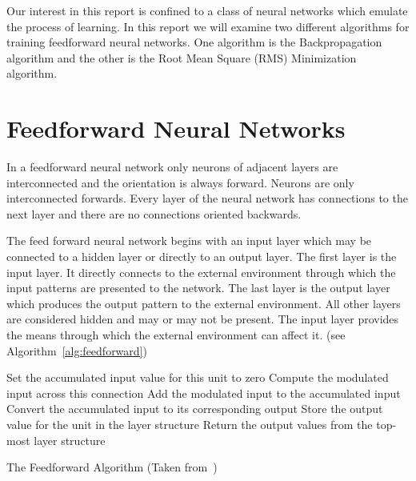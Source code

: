 \documentclass[11pt]{article}
\begin{document}
Our interest in this report is confined to a class of neural networks which emulate the process of learning. In this report we will
examine two different algorithms for training feedforward neural networks. One algorithm is the Backpropagation algorithm and the other
is the Root Mean Square (RMS) Minimization algorithm.

\section{Feedforward Neural Networks} %
\label{sec:feedforward_neural_networks}

In a feedforward neural network only neurons of adjacent layers are interconnected and the orientation is always forward. Neurons are
only interconnected forwards. Every layer of the neural network has connections to the next layer and there are no connections oriented
backwards.

The feed forward neural network begins with an input layer which may be connected to a hidden layer or directly to an output layer. The
first layer is the input layer. It directly connects to the external environment through which the input patterns are presented to the
network. The last layer is the output layer which produces the output pattern to the external environment. All other layers are
considered hidden and may or may not be present. The input layer provides the means through which the external environment can
affect it. (see Algorithm~\ref{alg:feedforward})

\begin{algorithm}%
\SetLine
{}
{
	{
		Set the accumulated input value for this unit to zero\;
			{
				Compute the modulated input across this connection\;
				Add the modulated input to the accumulated input\;
			}
		Convert the accumulated input to its corresponding output\;
		Store the output value for the unit in the layer structure\;
	}
	Return the output values from the top-most layer structure\;
}

\caption{The Feedforward Algorithm (Taken from~\cite{skapura})}
\label{alg:feedforward}
\end{algorithm}

\end{document}
